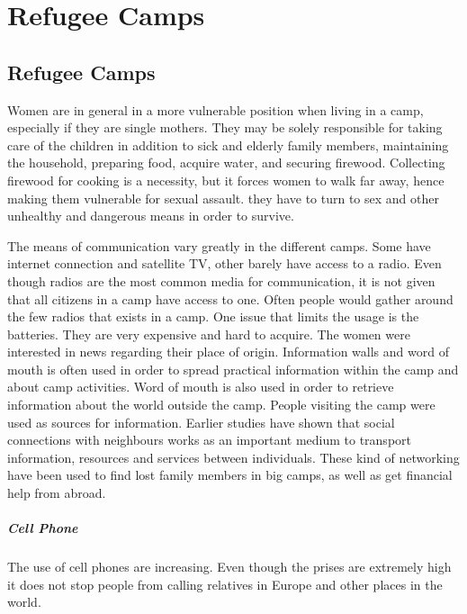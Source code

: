\chapter{Refugee Camps}
\label{chp:refugeecamps} 

\section{Refugee Camps}

Women are in general in a more vulnerable position when living in a  camp, especially if they are single mothers. They may be solely responsible for taking care of the children in addition to sick and elderly family members, maintaining the household, preparing food, acquire water, and securing firewood. Collecting firewood for cooking is a necessity, but it forces women  to walk far away, hence making them vulnerable for sexual assault. they have to turn to sex and other unhealthy and dangerous means in order to survive. \cite{womenRefugee} 


The means of communication vary greatly in the different camps. Some have internet connection and satellite TV, other barely have access to a radio. Even though radios are the most common media for communication, it is not given that all citizens in a camp have access to one. Often people would gather around the few radios that exists in a camp. One issue that limits the usage is the batteries. They are very expensive and hard to acquire. The women were interested in news regarding their place of origin. 
Information walls and word of mouth is often used in order to spread practical information within the camp and about camp activities. Word of mouth is also used in order to retrieve information about the world outside the camp. People visiting the camp were used as sources for information. Earlier studies have shown that social connections with neighbours works as an important medium to transport information, resources and services between individuals. These kind of networking have been used to find lost family members in big camps, as well as get financial help from abroad.   
\cite{womenRefugee}  

\paragraph{Cell Phone}
The use of cell phones are increasing. Even though the prises are extremely high it does not stop people from calling relatives in Europe and other places in the world. 
\cite{womenRefugee} 


